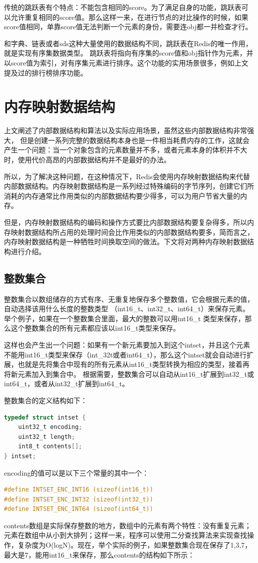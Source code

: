 \documentclass{zjutthesis}
\begin{document}
传统的跳跃表有个特点：不能包含相同的score。为了满足自身的功能，跳跃表可以允许重复相同的score值。那么这样一来，在进行节点的对比操作的时候，如果score值相同，单靠score值无法判断一个元素的身份，需要连obj都一并检查才行。

和字典、链表或者sds这种大量使用的数据结构不同，跳跃表在Redis的唯一作用，就是实现有序集数据类型。
跳跃表将指向有序集的score值和obj指针作为元素，并以score值为索引，对有序集元素进行排序。这个功能的实用场景很多，例如上文提及过的排行榜排序功能。


\section{内存映射数据结构}
上文阐述了内部数据结构和算法以及实际应用场景，虽然这些内部数据结构非常强大， 但是创建一系列完整的数据结构本身也是一件相当耗费内存的工作，这就会产生一个问题：当一个对象包含的元素数量并不多，或者元素本身的体积并不大时，使用代价高昂的内部数据结构并不是最好的办法。

所以，为了解决这种问题，在这种情况下，Redis会使用内存映射数据结构来代替内部数据结构。内存映射数据结构是一系列经过特殊编码的字节序列，创建它们所消耗的内存通常比作用类似的内部数据结构要少得多，可以为用户节省大量的内存。

但是，内存映射数据结构的编码和操作方式要比内部数据结构要复杂得多，所以内存映射数据结构所占用的处理时间会比作用类似的内部数据结构要多，简而言之，内存映射数据结构是一种牺牲时间换取空间的做法。下文将对两种内存映射数据结构进行介绍。

\subsection{整数集合}
整数集合以数组储存的方式有序、无重复地保存多个整数值，它会根据元素的值，自动选择该用什么长度的整数类型
（int16\_t、int32\_t、int64\_t）来保存元素。
举个例子，如果在一个整数集合里面，最大的整数可以用int16\_t
类型来保存，那么这个整数集合的所有元素都应该以int16\_t类型来保存。

这样也会产生出一个问题：如果有一个新元素要加入到这个intset，并且这个元素不能用int16\_t类型来保存（int\_32t或者int64\_t），那么这个intset就会自动进行扩展，也就是先将集合中现有的所有元素从int16\_t类型转换为相应的类型，接着再将新元素加入到集合中。
根据需要，整数集合可以自动从int16\_t扩展到int32\_t或int64\_t，或者从int32\_t扩展到int64\_t。

整数集合的定义结构如下：
\begin{lstlisting}[language=C]
typedef struct intset {
    uint32_t encoding;
    uint32_t length;
    int8_t contents[];
} intset;
\end{lstlisting}
encoding的值可以是以下三个常量的其中一个：
\begin{lstlisting}[language=C]
#define INTSET_ENC_INT16 (sizeof(int16_t))
#define INTSET_ENC_INT32 (sizeof(int32_t))
#define INTSET_ENC_INT64 (sizeof(int64_t))
\end{lstlisting}
contents数组是实际保存整数的地方，数组中的元素有两个特性：没有重复元素；元素在数组中从小到大排列；这样一来，程序可以使用二分查找算法来实现查找操作，复杂度为O(logN)。现在，举个实际的例子，如果整数集合现在保存了{1,3,7}，最大是7，能用int16\_t来保存，那么contents的结构如下所示：
\end{document}
